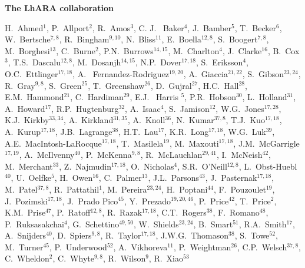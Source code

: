 \vspace{0.75cm}
\begin{center}
  {\bf \color{BlueViolet} The LhARA collaboration} \\
  \vspace{0.25cm}
\end{center}
\begin{center}
  H.~Ahmed$^{1}$,
  P.~Allport$^{2}$,
  R.~Amos$^{3}$,
  C. J. ~Baker$^{4}$,
  J.~Bamber$^{5}$,
  T.~Becker$^{6}$,
  W.~Bertsche$^{7,8}$,
  R.~Bingham$^{9,10}$,
  N.~Bliss$^{11}$,
  E.~Boella$^{12,8}$,
  S.~Boogert$^{7,8}$,
  M.~Borghesi$^{13}$,
  C.~Burne$^{2}$,
  P.N.~Burrows$^{14,15}$,
  M.~Charlton$^{4}$,
  J.~Clarke$^{16}$,
  B.~Cox$^{3}$,
  T.S.~Dascalu$^{12,8}$,
  M.~Dosanjh$^{14,15}$,
  N.P.~Dover$^{17,18}$,
  S.~Eriksson$^{4}$,
  O.C.~Ettlinger$^{17,18}$,
  A. ~Fernandez-Rodriguez$^{19,20}$,
  A.~Giaccia$^{21,22}$,
  S.~Gibson$^{23,24}$,
  R.~Gray$^{9,8}$,
  S.~Green$^{25}$,
  T.~Greenshaw$^{26}$,
  D.~Gujral$^{27}$,
  H.C.~Hall$^{28}$,
  E.M.~Hammond$^{21}$,
  C.~Hardiman$^{29}$,
  E.J. ~Harris $^{5}$,
  P.R.~Hobson$^{30}$,
  L.~Holland$^{31}$,
  A.~Howard$^{17}$,
  R.P.~Hugtenburg$^{32}$,
  A.~Isaac$^{4}$,
  S.~Jamison$^{12}$,
  W.G.~Jones$^{17,28}$,
  K.J.~Kirkby$^{33,34}$,
  A.~Kirkland$^{31,35}$,
  A.~Knoll$^{36}$,
  N.~Kumar$^{37,8}$,
  T.J.~Kuo$^{17,18}$,
  A.~Kurup$^{17,18}$,
  J.B.~Lagrange$^{38}$,
  H.T.~Lau$^{17}$,
  K.R.~Long$^{17,18}$,
  W.G.~Luk$^{39}$,
  A.E.~MacIntosh-LaRocque$^{17,18}$,
  T.~Masilela$^{19}$,
  M.~Maxouti$^{17,18}$,
  J.M.~McGarrigle$^{17,19}$,
  A.~McIlvenny$^{40}$,
  P.~McKenna$^{9,8}$,
  R.~McLauchlan$^{29,41}$,
  I.~McNeish$^{42}$,
  M.~Merchant$^{33}$,
  Z.~Najmudin$^{17,18}$,
  O.~Nicholas$^{4}$,
  S.R.~O'Neill$^{12,8}$,
  L.~Obst-Huebl$^{40}$,
  U.~Oelfke$^{5}$,
  H.~Owen$^{16}$,
  C.~Palmer$^{13}$,
  J.L.~Parsons$^{43}$,
  J.~Pasternak$^{17,18}$,
  M.~Patel$^{37,8}$,
  R.~Pattathil$^{1}$,
  M.~Pereira$^{23,24}$,
  H.~Poptani$^{44}$,
  F.~Pouzoulet$^{19}$,
  J.~Pozimski$^{17,18}$,
  J.~Prado Pico$^{45}$,
  Y.~Prezado$^{19,20,46}$,
  P.~Price$^{42}$,
  T.~Price$^{2}$,
  K.M.~Prise$^{47}$,
  P.~Ratoff$^{12,8}$,
  R.~Razak$^{17,18}$,
  C.T.~Rogers$^{38}$,
  F.~Romano$^{48}$,
  P.~Ruksasakchai$^{4}$,
  G.~Schettino$^{49,50}$,
  W.~Shields$^{23,24}$,
  B.~Smart$^{51}$,
  R.A.~Smith$^{17}$,
  A.~Snijders$^{40}$,
  D.~Spiers$^{9,8}$,
  R.~Taylor$^{17,18}$,
  J.W.G.~Thomason$^{38}$,
  S.~Towe$^{52}$,
  M.~Turner$^{45}$,
  P.~Underwood$^{52}$,
  A.~Vikhoreva$^{11}$,
  P.~Weightman$^{26}$,
  C.P.~Welsch$^{37,8}$,
  C.~Wheldon$^{2}$,
  C.~Whyte$^{9,8}$,
  R.~Wilson$^{9}$,
  R.~Xiao$^{53}$
\end{center}
